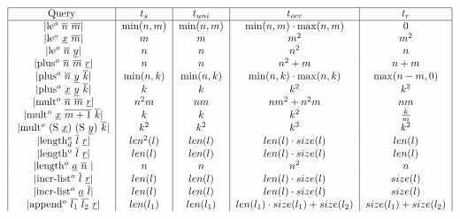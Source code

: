 \begin{figure}[t]
      \[ \begin{tabular}{|c|c|c|c|c|}
           \hline
           Query & $t_s$ & $t_{uni}$ & $t_{occ}$ & $t_r$  \\
           \hline
           \lstinline|le$^o$ $\overline{n}$ $\overline{m}$| & $\min(n, m)$ & $\min(n, m)$ & $\min(n, m) \cdot \max(n, m)$ & $0$  \\
           \lstinline|le$^o$ $\underline{x}$ $\overline{m}$| & $m$ & $m$ & $m^2$ & $m^2$  \\
           \lstinline|le$^o$ $\overline{n}$ $\underline{y}$| & $n$ & $n$ & $n^2$ & $n$  \\
           \lstinline|plus$^o$ $\overline{n}$ $\overline{m}$ $\underline{r}$| & $n$ & $n$ & $n^2 + m$ & $n + m$  \\
           \lstinline|plus$^o$ $\overline{n}$ $\underline{y}$ $\overline{k}$| & $\min(n, k)$ & $\min(n, k)$ & $\min(n, k) \cdot \max(n, k)$ & $\max(n - m, 0)$  \\
           \lstinline|plus$^o$ $\underline{x}$ $\underline{y}$ $\overline{k}$| & $k$ & $k$ & $k^2$ & $k^2$  \\
           \lstinline|mult$^o$ $\overline{n}$ $\overline{m}$ $\underline{r}$| & $n^2 m$ & $n m$ & $n m^2 + n^2 m$ & $n m$  \\
           \lstinline|mult$^o$ $\underline{x}$ $\overline{m + 1}$ $\overline{k}$| & $k$ & $k$ & $k^2$ & $\frac{k}{m}$  \\
           \lstinline|mult$^o$ (S $ \underline{x}$) (S $\underline{y}$) $\overline{k}$| & $k^2$ & $k^2$ & $k^3$ & $k^2$  \\
           \lstinline|length$_d^o$ $\overline{l}$ $\underline{r}$| & $len^2(l)$ & $len(l)$ & $len(l) \cdot size(l)$ & $len(l)$  \\
           \lstinline|length$^o$ $\overline{l}$ $\underline{r}$| & $len(l)$ & $len(l)$ & $len(l) \cdot size(l)$ & $len(l)$  \\
           \lstinline|length$^o$ $\underline{a}$ $\overline{n}$ | & $n$ & $n$ & $n^2$ & $n$  \\
           \lstinline|incr-list$^o$ $\overline{l}$ $\underline{r}$| & $len(l)$ & $len(l)$ & $len(l) \cdot size(l)$ & $size(l)$  \\
           \lstinline|incr-list$^o$ $\underline{a}$ $\overline{l}$| & $len(l)$ & $len(l)$ & $len(l) \cdot size(l)$ & $size(l)$  \\
           \lstinline|append$^o$ $\overline{l_1}$ $\overline{l_2}$ $\underline{r}$| & $len(l_1)$ & $len(l_1)$ & $len(l_1) \cdot size(l_1) + size(l_2)$ & $size(l_1) + size(l_2)$  \\

\end{tabular}\]
\end{figure}

